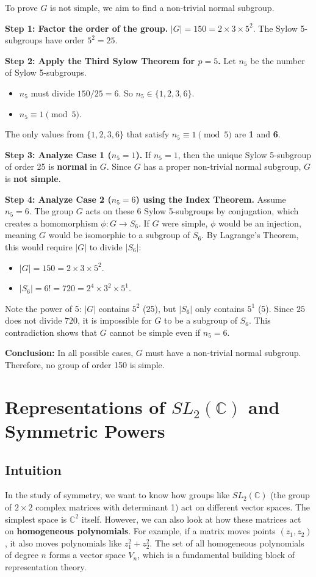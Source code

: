 \begin{example}
To prove $G$ is not simple, we aim to find a non-trivial normal subgroup.

\textbf{Step 1: Factor the order of the group.}
$|G| = 150 = 2 \times 3 \times 5^2$.
The Sylow 5-subgroups have order $5^2 = 25$.

\textbf{Step 2: Apply the Third Sylow Theorem for $p=5$.}
Let $n_5$ be the number of Sylow 5-subgroups.
\begin{itemize}
    \item $n_5$ must divide $150 / 25 = 6$. So $n_5 \in \{1, 2, 3, 6\}$.
    \item $n_5 \equiv 1 \pmod{5}$.
\end{itemize}
The only values from $\{1, 2, 3, 6\}$ that satisfy $n_5 \equiv 1 \pmod{5}$ are \textbf{1} and \textbf{6}.

\textbf{Step 3: Analyze Case 1 ($n_5 = 1$).}
If $n_5 = 1$, then the unique Sylow 5-subgroup of order 25 is \textbf{normal} in $G$. Since $G$ has a proper non-trivial normal subgroup, $G$ is \textbf{not simple}.

\textbf{Step 4: Analyze Case 2 ($n_5 = 6$) using the Index Theorem.}
Assume $n_5 = 6$. The group $G$ acts on these 6 Sylow 5-subgroups by conjugation, which creates a homomorphism $\phi: G \to S_6$.
If $G$ were simple, $\phi$ would be an injection, meaning $G$ would be isomorphic to a subgroup of $S_6$.
By Lagrange's Theorem, this would require $|G|$ to divide $|S_6|$:
\begin{itemize}
    \item $|G| = 150 = 2 \times 3 \times 5^2$.
    \item $|S_6| = 6! = 720 = 2^4 \times 3^2 \times 5^1$.
\end{itemize}
Note the power of 5: $|G|$ contains $5^2$ (25), but $|S_6|$ only contains $5^1$ (5). 
Since $25$ does not divide $720$, it is impossible for $G$ to be a subgroup of $S_6$.
This contradiction shows that $G$ cannot be simple even if $n_5 = 6$.

\textbf{Conclusion:} In all possible cases, $G$ must have a non-trivial normal subgroup. Therefore, no group of order 150 is simple.
\end{example}

\section{Representations of $SL_2(\mathbb{C})$ and Symmetric Powers}

\subsection{Intuition}
In the study of symmetry, we want to know how groups like $SL_2(\mathbb{C})$ (the group of $2 \times 2$ complex matrices with determinant 1) act on different vector spaces. The simplest space is $\mathbb{C}^2$ itself. However, we can also look at how these matrices act on \textbf{homogeneous polynomials}. For example, if a matrix moves points $(z_1, z_2)$, it also moves polynomials like $z_1^2 + z_2^2$. The set of all homogeneous polynomials of degree $n$ forms a vector space $V_n$, which is a fundamental building block of representation theory.


